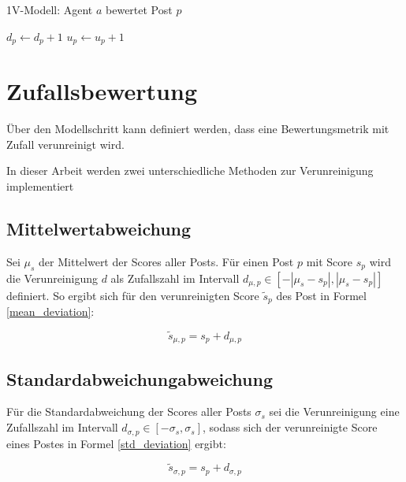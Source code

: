 \begin{algorithm}
	\label{1vschritt}
	\caption{1V-Modell: Agent $a$ bewertet Post $p$}
	\begin{algorithmic}
		\State $d_p \gets d_p + 1$
		\State $u_p \gets u_p + 1$
		\EndIf	
	\end{algorithmic} 
\end{algorithm}




\section{Zufallsbewertung}

Über den Modellschritt kann definiert werden, dass eine Bewertungsmetrik mit Zufall verunreinigt wird. 

In dieser Arbeit werden zwei unterschiedliche Methoden zur Verunreinigung implementiert

\subsection{Mittelwertabweichung}

Sei $\mu_s$ der Mittelwert der Scores aller Posts. Für einen Post $p$ mit Score $s_p$ wird die Verunreinigung $d$ als Zufallszahl im Intervall $d_{\mu,p} \in [-|\mu_s - s_p|,|\mu_s - s_p|]$ definiert. So ergibt sich für den verunreinigten Score $\tilde{s}_p$ des Post in Formel \ref{mean_deviation}:

\begin{equation}
\label{mean_deviation}
\tilde{s}_{\mu,p} =  s_p + d_{\mu,p}
\end{equation} 

\subsection{Standardabweichungabweichung}

Für die Standardabweichung der Scores aller Posts $\sigma_s$ sei die Verunreinigung eine Zufallszahl im Intervall $d_{\sigma,p} \in [-\sigma_s,\sigma_s]$, sodass sich der verunreinigte Score eines Postes in Formel \ref{std_deviation} ergibt:

\begin{equation}
\label{std_deviation}
\tilde{s}_{\sigma,p} = s_p + d_{\sigma,p}
\end{equation}

